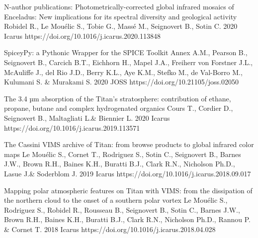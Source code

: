 \begin{cvpublications}{N-author publications:}
	{Photometrically-corrected global infrared mosaics of Enceladus: New implications for its spectral diversity and geological activity}
	{Robidel R., Le Mouélic S., Tobie  G., Massé M., Seignovert B., Sotin C.}
	{2020}
    {Icarus}
    {https://doi.org/10.1016/j.icarus.2020.113848}

	{SpiceyPy: a Pythonic Wrapper for the SPICE Toolkit}
	{Annex A.M., Pearson B., Seignovert B., Carcich B.T., Eichhorn H., Mapel J.A., Freiherr von Forstner J.L., McAuliffe J., del Rio J.D., Berry K.L., Aye K.M., Stefko M., de Val-Borro M., Kulumani S. \& Murakami S.}
	{2020}
    {JOSS}
    {https://doi.org/10.21105/joss.02050}

	{The 3.4 µm absorption of the Titan's stratosphere: contribution of ethane, propane, butane and complex hydrogenated organics}
	{Cours T., Cordier D., Seignovert B., Maltagliati L.\& Biennier L.}
	{2020}
    {Icarus}
    {https://doi.org/10.1016/j.icarus.2019.113571}

    {The Cassini VIMS archive of Titan: from browse products to global infrared color maps}
	{Le Mouélic S., Cornet T., Rodriguez S., Sotin C., Seignovert B., Barnes J.W., Brown R.H., Baines K.H., Buratti B.J., Clark R.N., Nicholson Ph.D., Lasue J.\& Soderblom J.}
	{2019}
    {Icarus}
    {https://doi.org/10.1016/j.icarus.2018.09.017}

    {Mapping polar atmospheric features on Titan with VIMS: from the dissipation of the northern cloud to the onset of a southern polar vortex}
	{Le Mouélic S., Rodriguez S., Robidel R., Rousseau B., Seignovert B., Sotin C., Barnes J.W., Brown R.H., Baines K.H., Buratti B.J., Clark R.N., Nicholson Ph.D., Rannou P. \& Cornet T.}
	{2018}
    {Icarus}
    {https://doi.org/10.1016/j.icarus.2018.04.028}


\end{cvpublications}
